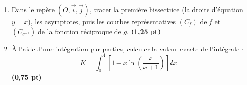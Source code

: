 \documentclass[12pt,a4paper]{article}
\begin{document}
\begin{enumerate}
    \item Dans le repère $(O, \vec{i}, \vec{j})$, tracer la première bissectrice (la droite d'équation $y=x$), les asymptotes, puis les courbes représentatives $(C_f)$ de $f$ et $(C_{g^{-1}})$ de la fonction réciproque de $g$. \hfill \textbf{(1,25 pt)}
    \item À l'aide d'une intégration par parties, calculer la valeur exacte de l'intégrale :
    \[
    K = \int_0^4 \left[ 1 - x\ln\left(\dfrac{x}{x+1}\right) \right] dx
    \]\hfill \textbf{(0,75 pt)}
\end{enumerate}
\end{document}
